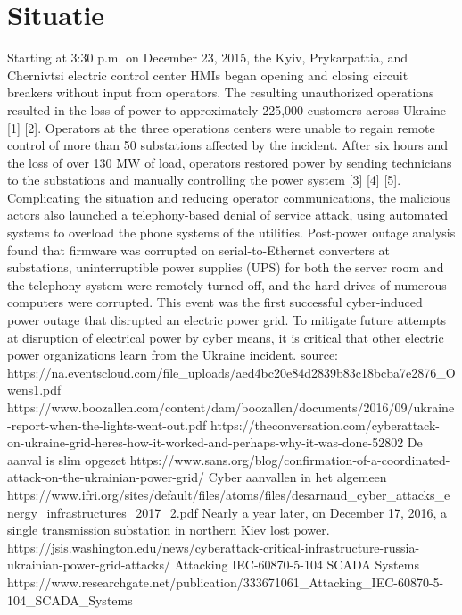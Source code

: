 \documentclass[11pt]{report}
\begin{document}
\section{Situatie}
Starting at 3:30 p.m. on December 23, 2015, the Kyiv,
Prykarpattia, and Chernivtsi electric control center HMIs
began opening and closing circuit breakers without input from
operators. The resulting unauthorized operations resulted in
the loss of power to approximately 225,000 customers across
Ukraine [1] [2]. Operators at the three operations centers were
unable to regain remote control of more than 50 substations
affected by the incident. After six hours and the loss of over
130 MW of load, operators restored power by sending
technicians to the substations and manually controlling the
power system [3] [4] [5].
Complicating the situation and reducing operator
communications, the malicious actors also launched a
telephony-based denial of service attack, using automated
systems to overload the phone systems of the utilities.
Post-power outage analysis found that firmware was
corrupted on serial-to-Ethernet converters at substations,
uninterruptible power supplies (UPS) for both the server room
and the telephony system were remotely turned off, and the
hard drives of numerous computers were corrupted.
This event was the first successful cyber-induced power
outage that disrupted an electric power grid. To mitigate future
attempts at disruption of electrical power by cyber means, it is critical that other electric power organizations learn from the
Ukraine incident.
source: https://na.eventscloud.com/file_uploads/aed4bc20e84d2839b83c18bcba7e2876_Owens1.pdf
https://www.boozallen.com/content/dam/boozallen/documents/2016/09/ukraine-report-when-the-lights-went-out.pdf
https://theconversation.com/cyberattack-on-ukraine-grid-heres-how-it-worked-and-perhaps-why-it-was-done-52802
De aanval is slim opgezet
https://www.sans.org/blog/confirmation-of-a-coordinated-attack-on-the-ukrainian-power-grid/
Cyber aanvallen in het algemeen
https://www.ifri.org/sites/default/files/atoms/files/desarnaud_cyber_attacks_energy_infrastructures_2017_2.pdf
Nearly a year later, on December 17, 2016, a single transmission substation in northern Kiev lost power.
https://jsis.washington.edu/news/cyberattack-critical-infrastructure-russia-ukrainian-power-grid-attacks/
Attacking IEC-60870-5-104 SCADA Systems
https://www.researchgate.net/publication/333671061_Attacking_IEC-60870-5-104_SCADA_Systems
\end{document}

